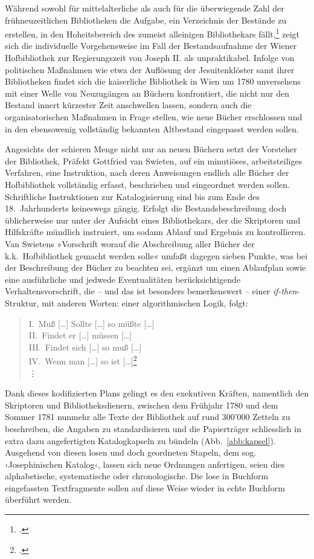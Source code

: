 \documentclass[a4paper,11pt]{article}
\newcommand{\anf}[1]{»#1«}
\newcommand{\inanf}[1]{›#1‹}
\begin{document}
Während sowohl für mittelalterliche als auch für die überwiegende Zahl der frühneuzeitlichen Bibliotheken die Aufgabe, ein Verzeichnis der Bestände zu erstellen, in den Hoheitsbereich des zumeist alleinigen Bibliothekars fällt,\footcite[Vgl. für die mittelalterliche Katalogpraxis etwa][]{schreiber:1927} zeigt sich die individuelle Vorgehensweise im Fall der Bestandsaufnahme der Wiener Hofbibliothek zur Regierungszeit von Joseph II. als unpraktikabel. Infolge von politischen Maßnahmen wie etwa der Auflösung der Jesuitenklöster samt ihrer Bibliotheken findet sich die kaiserliche Bibliothek in Wien um 1780 unversehens mit einer Welle von Neuzugängen an Büchern konfrontiert, die nicht nur den Bestand innert kürzester Zeit anschwellen lassen, sondern auch die organisatorischen Maßnahmen in Frage stellen, wie neue Bücher erschlossen und in den ebensowenig vollständig bekannten Altbestand eingepasst werden sollen.   
  
Angesichts der schieren Menge nicht nur an neuen Büchern setzt der Vorsteher der Bibliothek, Präfekt Gottfried van Swieten, auf ein minutiöses, arbeitsteiliges Verfahren, eine Instruktion, nach deren Anweisungen endlich alle Bücher der Hofbibliothek vollständig erfasst, beschrieben und eingeordnet werden sollen. Schriftliche Instruktionen zur Katalogisierung sind bis zum Ende des 18.~Jahrhunderts keineswegs gängig. Erfolgt die Bestandsbeschreibung doch üblicherweise nur unter der Aufsicht eines Bibliothekars, der die Skriptoren und Hilfskräfte mündlich instruiert, um sodann Ablauf und Ergebnis zu kontrollieren. Van Swietens \anf{Vorschrift worauf die Abschreibung aller Bücher der k.k.~Hofbibliothek gemacht werden solle} umfaßt dagegen sieben Punkte, was bei der Beschreibung der Bücher zu beachten sei, ergänzt um einen Ablaufplan sowie eine ausführliche und jedwede Eventualitäten berücksichtigende Verhaltensvorschrift, die – und das ist besonders bemerkenswert – einer \emph{if-then}-Struktur, mit anderen Worten: einer algorithmischen Logik, folgt:
\begin{verse}
I.~Muß [\ldots] Sollte [\ldots] so müßte [\ldots]\\
II.~Findet er [\ldots] müssen [\ldots]\\
III.~Findet sich [\ldots] so muß [\ldots]\\ 
IV.~Wenn man [\ldots] so ist [\ldots]\footcite[125 f.]{bartsch:1780}\\
\qquad\vdots\\ %
\end{verse}
Dank dieses kodifizierten Plans gelingt es den exekutiven Kräften, namentlich den Skriptoren und Bibliotheksdienern, zwischen dem Frühjahr 1780 und dem Sommer 1781 nunmehr alle Texte der Bibliothek auf rund 300'000 Zetteln zu beschreiben, die Angaben zu standardisieren und die Papierträger schliesslich in extra dazu angefertigten Katalogkapseln zu bündeln (Abb.~\ref{abb:kapsel}). Ausgehend von diesen losen und doch geordneten Stapeln, dem sog. \inanf{Josephinischen Katalog}, lassen sich neue Ordnungen anfertigen, seien dies alphabetische, systematische oder chronologische. Die lose in Buchform eingefassten Textfragmente sollen auf diese Weise wieder in echte Buchform überführt werden.
\end{document}
